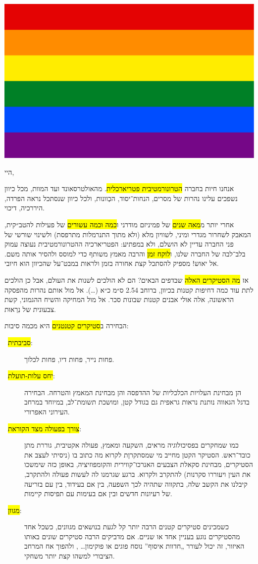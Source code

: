 



\color{magenta}
\setRL{}
\includegraphics[width=\textwidth, height=1ex]{flag.eps}

\vspace{0.5cm}

{
\setlength{\parindent}{0cm}
\setlength{\parskip}{0.5cm}

היי,

אנחנו חיות בחברה \hl{הטרונורמטיבית פטריארכלית}. מהאולטרסאונד ועד המוות, מכל כיוון נשפכים עלינו נהרות של מסרים, הנחות־יסוד, הכְוונות, ולכל כיוון שנסתכל נראה הפרדה, היררכיה, דיכוי.

אחרי יותר מ\hl{מאה שנים} של פמיניזם מודרני ו\hl{כמה וכמה עשורים} של פעילות להטב״קית, המאבק לשחרור מגדרי ומיני, לשוויון מלא (ולא מתוך התנרמלות מתרפסת) ולשינוי שורשי של פני החברה עדיין לא הושלם, ולא במפתיע: הפטריארכיה ההטרונורמטיבית נעוצה עמוק בלב־לבה של החברה שלנו, ו\hl{לוקח זמן} והרבה מאמץ משותף כדי למוסס ולהסיר אותה משם. אל יאוש! מספיק להסתכל קצת אחורה בזמן ולראות במבט־על שהכיוון הוא חיובי.

אז \hl{מה הסטיקרים האלה} שבדפים הבאים? הם לא הולכים לשנות את העולם, אבל כן הולכים לתת עוד כמה דחיפות קטנות בכיוון, ברוחב 2.54 ס״מ כ״א (…). אל מול אותם נהרות מהפסקה הראשונה, אלה אולי אבנים קטנות שבונות סכר. אל מול המחיקה והשיח ההגמוני, קשת צבעונית של נִרְאוּת.

\flagline

\newcommand{\descitem}[2]{\item[\symbolglyph{◃}~#1\hspace{1em}]#2}
הבחירה ב\hl{סטיקרים קטנטנים} היא מכמה סיבות:
\begin{description}
	\descitem{\hl{סביבתית}:}{פחות נייר, פחות דיו, פחות לכלוך.}
	\descitem{\hl{יחס עלות-תועלת}:}{הן מבחינת העלויות הכלכליות של ההדפסה והן מבחינת המאמץ והטרחה. הבחירה בדגל הגאווה נותנת נראות גראפית גם בגודל קטן, ומושכת תשומת־לב, במיוחד במרחב העירוני האפרורי.}
	\descitem{\hl{צורך בפעולה מצד הקוראת}:}{כמו שמחקרים בפסיכולוגיה מראים, השקעה ומאמץ, פעולה אקטיבית, גוררת מתן כובד־ראש. הסטיקר הקטן מחייב מי שמסתקרןת לקרוא מה כתוב בו (ניסיתי לעצב את הסטיקרים, מבחינת סקאלת הצבעים האנרכו־קווירית והקומפוזיציה, באופן כזה שימשכו את העין ויעוררו סקרנות) להתקרב ולקרוא. ברגע שגרמנו לה לעשות פעולה ולהתקרב, קיבלנו את הקשב שלה, בתקווה שתהיה לכך השפעה, בין אם בעידוד, בין עם בזריעה של רעיונות חדשים ובין אם בעימות עם תפיסות קיימות.}
	\descitem{\hl{מגוון}:}{כשמכינים סטיקרים קטנים הרבה יותר קל לגעת בנושאים מגוונים, כשכל אחד מהסטיקרים נוגע בעניין אחד או שניים. אם מדביקים הרבה סטיקרים שונים באותו האיזור, זה יכול לעורר „חדוות איסוף” נוסח פוגים או פוקימון… \symbolglyph{☺}, ולהפוך אח המרחב הציבורי למשהו קצת יותר משחקי.

}
\end{description}}
